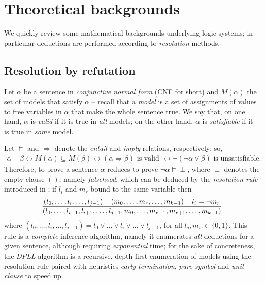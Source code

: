 \documentclass[a4paper,12pt]{article}
\begin{document}
\section{Theoretical backgrounds}

We quickly review some mathematical backgrounds underlying logic systems;
in particular deductions are performed according to \emph{resolution} methods.

\subsection{Resolution by refutation}

Let $\alpha$ be a sentence in \emph{conjunctive normal
form} (CNF for short) and $M(\alpha)$ the set of models that satisfy $\alpha$
-- recall that a \emph{model} is a set of assignments of values to free
variables in $\alpha$ that make the whole sentence true.  We say that, on one
hand, $\alpha$ is \textit{valid} if it is true in \textit{all} models; on the
other hand, $\alpha$ is \textit{satisfiable} if it is true in \textit{some}
model.

Let $\models$ and $\Rightarrow$ denote the \textit{entail} and \textit{imply}
relations, respectively; so,
\begin{displaymath}
\begin{split}
\alpha \models \beta \leftrightarrow
M(\alpha) \subseteq M(\beta) \leftrightarrow
(\alpha \Rightarrow \beta) \text{ is valid } \leftrightarrow
\neg(\neg\alpha \vee \beta) \text{ is unsatisfiable.}
\end{split}
\end{displaymath}
Therefore, to prove a sentence $\alpha$ reduces to prove
$\neg\alpha\models\perp$, where $\perp$ denotes the empty clause $()$, namely
\textit{falsehood}, which can be deduced by the \textit{resolution rule}
introduced in \citep{Robinson:1965:MLB:321250.321253}; if $l_{i}$ and $m_{r}$
bound to the same variable then
\begin{displaymath}
{\left(l_{0}, \ldots, l_{i}, \ldots, l_{j-1}\right) \quad \left(m_{0}, \ldots, m_{r},\ldots, m_{k-1}\right) \quad l_{i} = \neg m_{r}
\over
\left(l_{0},\ldots, l_{i-1},l_{i+1}, \ldots,l_{j-1}, m_{0},\ldots, m_{r-1},m_{r+1},\ldots, m_{k-1}\right)}
\end{displaymath}
where $\left(l_{0},\ldots, l_{i}, \ldots, l_{j-1}\right) = l_{0}\vee \ldots
\vee l_{i} \vee \ldots \vee l_{j-1}$, for all $l_{q}, m_{w} \in\lbrace 0,1\rbrace$.
This rule is a \textit{complete} inference algorithm, namely it enumerates
\emph{all} deductions for a given sentence, although requiring
\emph{exponential} time; for the sake of concreteness, the \textit{DPLL}
algorithm \citep{Davis:1962:MPT:368273.368557}
is a recursive, depth-first enumeration of models using the
resolution rule paired with heuristics \textit{early termination},
\textit{pure symbol} and \textit{unit clause} to speed up.
\end{document}
